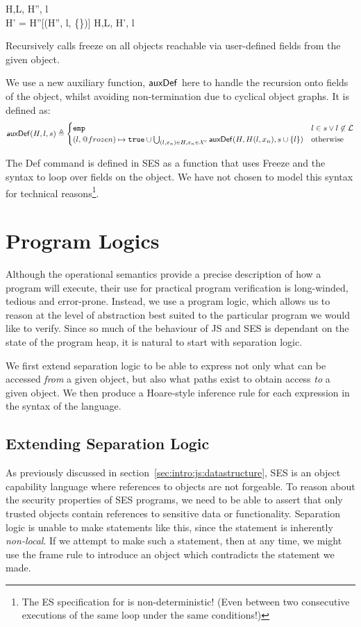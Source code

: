 \documentclass[a4paper,notitlepage]{report}
\begin{document}
  {H,L, \gevalsto H'', l \\
   H' = H''[\auxDef(H'', l, \{\})]}
  {H,L, \evalsto H', l}

Recursively calls freeze on all objects reachable
via user-defined fields from the given object.

We use a new auxiliary function, $\mathsf{auxDef}$ here to handle the recursion onto
fields of the object, whilst avoiding non-termination due to cyclical object
graphs. It is defined as:
\[
  \mathsf{auxDef}(H,l,s) \triangleq \begin{cases}
    \texttt{emp} & l \in s \lor l \not\in \mathcal{L} \\
    (l,@frozen) \mapsto \texttt{true} \cup \bigcup_{(l,x_n) \in H, x_n \in \mathcal{X}^{\textsc{u}}}
      \mathsf{auxDef}(H,H(l,x_n),s \cup\{l\}) & \mbox{otherwise} \\
  \end{cases}
\]

The Def command is defined in SES as a function that uses Freeze and the
 syntax to loop over fields on the object. We have not chosen to
model this syntax for technical reasons\footnote{The ES specification for
 is non-deterministic! (Even between two consecutive executions of
the same loop under the same conditions!)}.

\chapter{Program Logics}
\label{chap:proglogic}
Although the operational semantics provide a precise description of how a
program will execute, their use for practical program verification is
long-winded, tedious and error-prone. Instead, we use a program logic, which
allows us to reason at the level of abstraction best suited to the particular
program we would like to verify. Since so much of the behaviour of JS and SES is
dependant on the state of the program heap, it is natural to start with
separation logic.

We first extend separation logic to be able to express not only what can be
accessed \emph{from} a given object, but also what paths exist to obtain access
\emph{to} a given object. We then produce a Hoare-style inference rule for each
expression in the syntax of the language.

\section{Extending Separation Logic}
\label{sec:extendingseplog}
As previously discussed in section~\ref{sec:intro:js:datastructure}, SES is an
object capability language where references to objects are not forgeable.
To reason about the security properties of SES programs, we need to be able to
assert that only trusted objects contain references to sensitive data or
functionality. 
Separation logic is unable to make statements like this, since the
statement is inherently \emph{non-local}. If we attempt to make such a
statement, then at any time, we might use the frame rule to introduce an object
which contradicts the statement we made.
\end{document}
